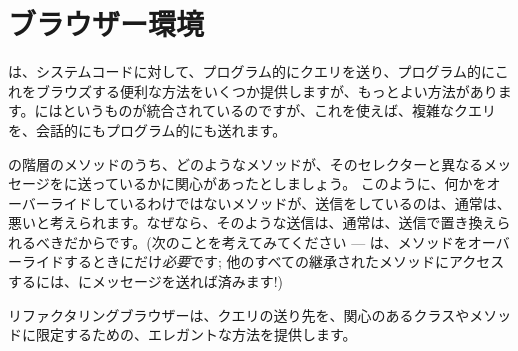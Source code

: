 \documentclass[a4paper,10pt,twoside]{book}
\begin{document}
\section{ブラウザー環境}

は、システムコードに対して、プログラム的にクエリを送り、プログラム的にこれをブラウズする便利な方法をいくつか提供しますが、もっとよい方法があります。\pharo にはというものが統合されているのですが、これを使えば、複雑なクエリを、会話的にもプログラム的にも送れます。

の階層のメソッドのうち、どのようなメソッドが、そのセレクターと異なるメッセージを\super に送っているかに関心があったとしましょう。
このように、何かをオーバーライドしているわけではないメソッドが、\super 送信をしているのは、通常は、悪いと考えられます。なぜなら、そのような\super 送信は、通常は、\self 送信で置き換えられるべきだからです。(次のことを考えてみてください --- \super は、メソッドをオーバーライドするときにだけ\emph{必要}です; 他のすべての継承されたメソッドにアクセスするには、\self にメッセージを送れば済みます!)

リファクタリングブラウザーは、クエリの送り先を、関心のあるクラスやメソッドに限定するための、エレガントな方法を提供します。

\end{document}
